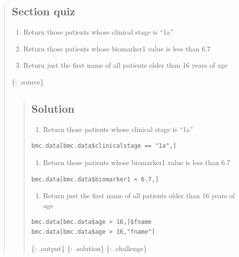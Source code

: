 \documentclass[]{article}
\providecommand{\tightlist}{%
  \setlength{\itemsep}{0pt}\setlength{\parskip}{0pt}}
\begin{document}
\begin{quote}
\subsection{Section quiz}\label{section-quiz}

\begin{enumerate}
\def\labelenumi{\arabic{enumi}.}
\item
  Return those patients whose clinical stage is ``1a''
\item
  Return those patients whose biomarker1 value is less than 6.7
\item
  Return just the first name of all patients older than 16 years of age
\end{enumerate}

\{: .source\}

\begin{quote}
\subsection{Solution}\label{solution}

\begin{enumerate}
\def\labelenumi{\arabic{enumi}.}
\tightlist
\item
  Return those patients whose clinical stage is ``1a''
\end{enumerate}

\begin{verbatim}
bmc.data[bmc.data$clinicalstage == "1a",]
\end{verbatim}

\begin{enumerate}
\def\labelenumi{\arabic{enumi}.}
\setcounter{enumi}{1}
\tightlist
\item
  Return those patients whose biomarker1 value is less than 6.7
\end{enumerate}

\begin{verbatim}
bmc.data[bmc.data$biomarker1 < 6.7,]
\end{verbatim}

\begin{enumerate}
\def\labelenumi{\arabic{enumi}.}
\setcounter{enumi}{2}
\tightlist
\item
  Return just the first name of all patients older than 16 years of age
\end{enumerate}

\begin{verbatim}
bmc.data[bmc.data$age > 16,]$fname
bmc.data[bmc.data$age > 16,"fname"]
\end{verbatim}

\{: .output\} \{: .solution\} \{: .challenge\}
\end{quote}
\end{quote}
\end{document}
